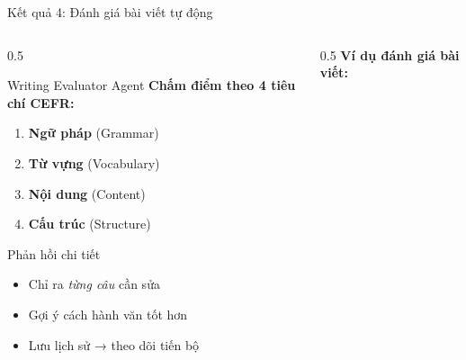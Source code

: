 \documentclass[notheorems,hyperref={bookmarks=true}]{beamer}
\begin{document}
\begin{frame}{Kết quả 4: Đánh giá bài viết tự động}
\begin{columns}
    \begin{column}{0.5\textwidth}
        \begin{exampleblock}{Writing Evaluator Agent}
            \textbf{Chấm điểm theo 4 tiêu chí CEFR:}
            \begin{enumerate}
                \item \textbf{Ngữ pháp} (Grammar)
                \item \textbf{Từ vựng} (Vocabulary)
                \item \textbf{Nội dung} (Content)
                \item \textbf{Cấu trúc} (Structure)
            \end{enumerate}
        \end{exampleblock}
        
        \vspace{0.3cm}
        
        \begin{block}{Phản hồi chi tiết}
            \begin{itemize}
                \item Chỉ ra \textit{từng câu} cần sửa
                \item Gợi ý cách hành văn tốt hơn
                \item Lưu lịch sử → theo dõi tiến bộ
            \end{itemize}
        \end{block}
    \end{column}
    \begin{column}{0.5\textwidth}
        \centering
        \textbf{Ví dụ đánh giá bài viết:}\\[0.3cm]
        
    \end{column}
\end{columns}
\end{frame}
\end{document}
